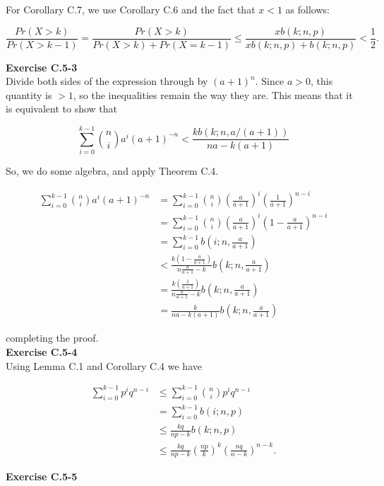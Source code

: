 \documentclass{article}
\begin{document}
For Corollary C.7, we use Corollary C.6 and the fact that $x < 1$ as follows:

\[ \frac{Pr(X > k)}{Pr(X>k-1)} = \frac{Pr(X>k)}{Pr(X>k)+Pr(X=k-1)} \leq \frac{xb(k;n,p)}{xb(k;n,p) + b(k;n,p)}  < \frac{1}{2}.\]

\noindent\textbf{Exercise C.5-3}\\

Divide both sides of the expression through by $(a+1)^n$. Since $a>0$, this quantity is $>1$, so the inequalities remain the way they are. This means that it is equivalent to show that

\[
\sum_{i=0}^{k-1} \binom{n}{i} a^i (a+1)^{-n} < \frac{kb(k;n,a/(a+1))}{na - k(a+1)}
\]

So, we do some algebra, and apply Theorem C.4.

\begin{align*}
\sum_{i=0}^{k-1} \binom{n}{i} a^i (a+1)^{-n} & = \sum_{i=0}^{k-1}\binom{n}{i} \left(\frac{a}{a+1}\right)^i \left( \frac{1}{a+1}\right)^{n-i}\\
&= \sum_{i=0}^{k-1}\binom{n}{i} \left(\frac{a}{a+1}\right)^i \left(1 - \frac{a}{a+1}\right)^{n-i}\\
&= \sum_{i=0}^{k-1}b(i;n,\frac{a}{a+1})\\
&< \frac{k\left(1-\frac{a}{a+1}\right)}{n \frac{a}{a+1} - k}b(k;n,\frac{a}{a+1})\\
&= \frac{k\left(\frac{1}{a+1}\right)}{n \frac{a}{a+1} - k}b(k;n,\frac{a}{a+1})\\
&= \frac{k}{n a - k(a+1)}b(k;n,\frac{a}{a+1})
\end{align*}

completing the proof.\\

\noindent\textbf{Exercise C.5-4}\\

Using Lemma C.1 and Corollary C.4 we have 

\begin{align*} 
\sum_{i=0}^{k-1} p^iq^{n-i} &\leq \sum_{i=0}^{k-1} {n \choose i}p^iq^{n-i} \\
&= \sum_{i=0}^{k-1}b(i;n,p) \\
&\leq \frac{kq}{np-k}b(k;n,p) \\
&\leq \frac{kq}{np-k}\left(\frac{np}{k}\right)^k \left(\frac{nq}{n-k}\right)^{n-k}.
\end{align*}

\noindent\textbf{Exercise C.5-5}\\
\end{document}
